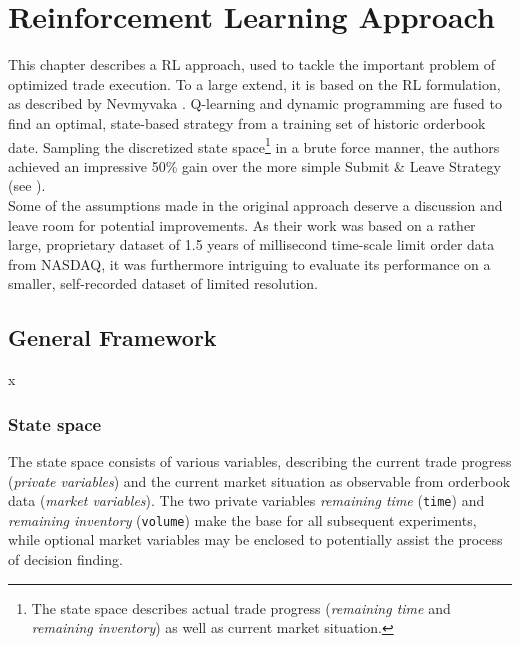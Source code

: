 \chapter{Reinforcement Learning Approach}
\label{chap:reinforcementlearning}
This chapter describes a \ac{RL} approach, used to tackle the important problem of optimized trade execution. To a large extend, it is based on the \ac{RL} formulation, as described by Nevmyvaka \etal \cite{Nevmyvaka:2006}. Q-learning and dynamic programming are fused to find an optimal, state-based strategy from a training set of historic orderbook date. Sampling the discretized state space\footnote{The state space describes actual trade progress (\ie \emph{remaining time} and \emph{remaining inventory}) as well as current market situation.} in a brute force manner, the authors achieved an impressive 50\% gain over the more simple Submit \& Leave Strategy (see ).\\

Some of the assumptions made in the original approach deserve a discussion and leave room for potential improvements. As their work was based on a rather large, proprietary dataset of 1.5 years of millisecond time-scale limit order data from \acs{NASDAQ}, it was furthermore intriguing to evaluate its performance on a smaller, self-recorded dataset of limited resolution.


\section{General Framework}
\label{chap:reinforcementlearning:original}
x


\subsection{State space}
\label{chap:statespace}
The state space consists of various variables, describing the current trade progress (\emph{private variables}) and the current market situation as observable from orderbook data (\emph{market variables}). The two private variables \emph{remaining time} (\lstinline!time!) and \emph{remaining inventory} (\lstinline!volume!) make the base for all subsequent experiments, while optional market variables may be enclosed to potentially assist the process of decision finding.\\

